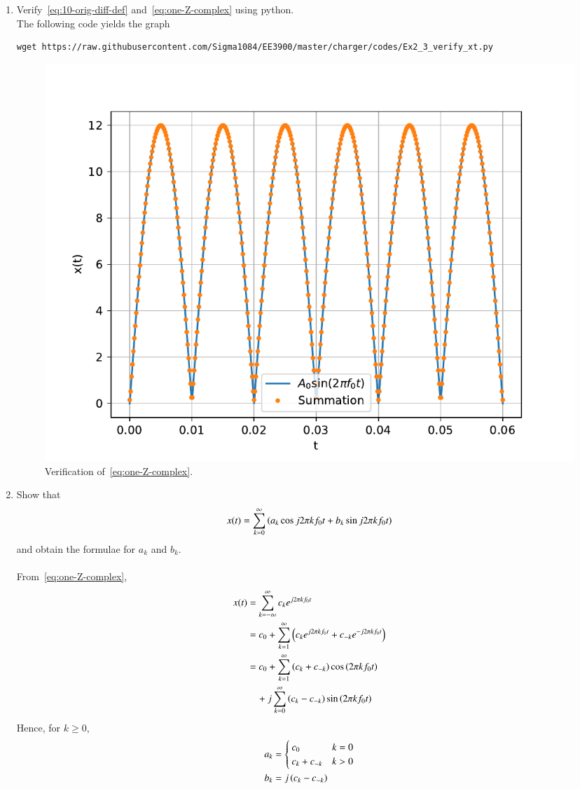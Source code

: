 \documentclass[journal,12pt,twocolumn]{IEEEtran}
\renewcommand\thesection{\arabic{section}}
\begin{document}
\begin{enumerate}[label=\thesection.\arabic*,ref=\thesection.\theenumi]
\item Verify~\eqref{eq:10-orig-diff-def} and~\eqref{eq:one-Z-complex} using python. \\
	\solution
	The following code yields the graph
	\begin{lstlisting}
wget https://raw.githubusercontent.com/Sigma1084/EE3900/master/charger/codes/Ex2_3_verify_xt.py
	\end{lstlisting}
	\begin{figure}[!ht]
    \includegraphics[width=\columnwidth]{figs/Ex2_3_verify_xt}
		\caption{Verification of~\eqref{eq:one-Z-complex}.}
		\label{fig:verify_xt}
	\end{figure}
	

\item Show that 
	\begin{align}
		x(t) = \sum_{k = 0}^{\infty}\left(a_k\cos{j2\pi kf_0 t}+b_k\sin{j2\pi kf_0 t}\right)
	\label{eq:one-Z-real}
	\end{align}
	and obtain the formulae for $a_k$ and $b_k$. \\
	\solution\\
	\solution From~\eqref{eq:one-Z-complex},
	\begin{align*}
		x(t) &= \sum_{k = -\infty}^{\infty}c_k e^{j2\pi kf_0 t} \\
		&= c_0 + \sum_{k = 1}^{\infty} \left(c_k e^{j2\pi kf_0 t} + c_{-k}e^{-j2\pi kf_0 t}\right) \\
		&= c_0 + \sum_{k = 1}^{\infty} \left(c_k + c_{-k}\right)\cos\left(2\pi kf_0 t\right) \\
		& \quad + j\sum_{k = 0}^{\infty}\left(c_k - c_{-k}\right)\sin\left(2\pi kf_0 t\right)
	\end{align*}
	Hence, for \( k \ge 0 \),
	\begin{align}
		a_k &= 
		\begin{cases}
			c_0 & k = 0 \\
			c_k + c_{-k} & k > 0
		\end{cases}
		\label{eq:ak} \\
		b_k &= j \left(c_k - c_{-k}\right)
		\label{eq:bk}
	\end{align}
	


\end{enumerate}
\end{document}

